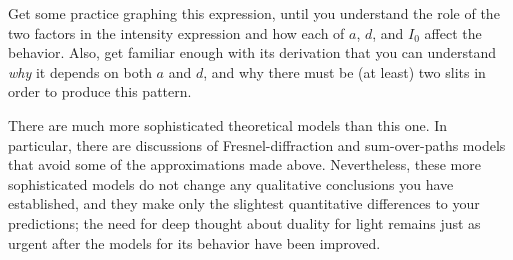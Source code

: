 \documentclass[11pt]{article}
\begin{document}
Get some practice graphing this expression, until you understand the role of the
two factors in the intensity expression and how each of $a$, $d$, and $I_0$ affect the
behavior. Also, get familiar enough with its
derivation that you can understand
\textit{why} it depends on both $a$ and $d$, and why there must be (at least) two slits 
in order to produce this pattern.


There are much more sophisticated theoretical models than this one. In
particular, there are discussions of Fresnel-diffraction and sum-over-paths
models that avoid some of the approximations made above. Nevertheless, these
more sophisticated models do not change any qualitative conclusions you have
established, and they make only the slightest quantitative differences to your
predictions; the need for deep thought about duality for light remains just as
urgent after the models for its behavior have been improved.

\vspace{5mm}


\end{document}
